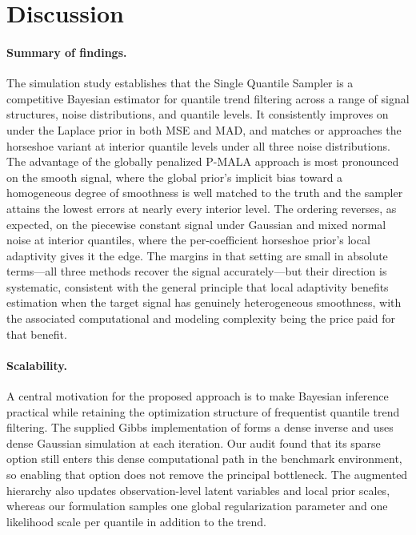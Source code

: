 
\section{Discussion}
\label{sec:discussion}

\paragraph{Summary of findings.}
The simulation study establishes that the Single Quantile Sampler is a competitive Bayesian estimator for quantile trend filtering across a range of signal structures, noise distributions, and quantile levels. It consistently improves on \citet{onizuka2024fast} under the Laplace prior in both MSE and MAD, and matches or approaches the horseshoe variant at interior quantile levels under all three noise distributions. The advantage of the globally penalized P-MALA approach is most pronounced on the smooth signal, where the global prior's implicit bias toward a homogeneous degree of smoothness is well matched to the truth and the sampler attains the lowest errors at nearly every interior level. The ordering reverses, as expected, on the piecewise constant signal under Gaussian and mixed normal noise at interior quantiles, where the per-coefficient horseshoe prior's local adaptivity gives it the edge. The margins in that setting are small in absolute terms---all three methods recover the signal accurately---but their direction is systematic, consistent with the general principle that local adaptivity benefits estimation when the target signal has genuinely heterogeneous smoothness, with the associated computational and modeling complexity being the price paid for that benefit.

\paragraph{Scalability.}
A central motivation for the proposed approach is to make Bayesian inference practical while retaining the optimization structure of frequentist quantile trend filtering. The supplied Gibbs implementation of \citet{onizuka2024fast} forms a dense inverse and uses dense Gaussian simulation at each iteration. Our audit found that its sparse option still enters this dense computational path in the benchmark environment, so enabling that option does not remove the principal bottleneck. The augmented hierarchy also updates observation-level latent variables and local prior scales, whereas our formulation samples one global regularization parameter and one likelihood scale per quantile in addition to the trend.

